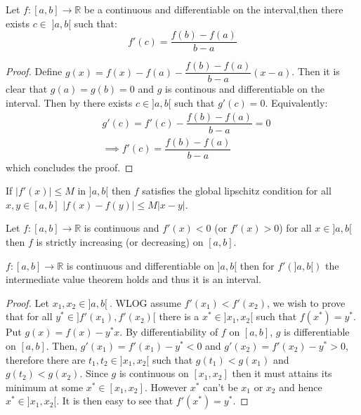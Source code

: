 \begin{theorem}\label{MVT}
    Let \(f: [a,b] \to \mathbb{R}\) be a continuous and differentiable on the interval,then there exists \(c \in \; ]a,b[\) such that:
    \[f'(c) = \dfrac{f(b) - f(a)}{b - a}\]
\end{theorem}
\begin{proof}
    Define \(g(x) = f(x)  - f(a) - \dfrac{f(b) - f(a)}{b-a}(x-a)\). Then it is clear that \(g(a) = g(b) = 0\) and \(g\) is continous and differentiable on the interval. Then by  there exists \(c \in ]a,b[\) such that \(g'(c) = 0\). Equivalently:
    \begin{align*}
         & g'(c) = f'(c) -  \dfrac{f(b) - f(a)}{b-a} = 0 \\
         & \implies f'(c) =  \dfrac{f(b) - f(a)}{b-a}
    \end{align*}
    which concludes the proof.
\end{proof}
\begin{corollary}
    If \(|f'(x)| \leq M \) in \(]a,b[\) then \(f\) satisfies the global lipschitz condition for all \(x,y \in [a,b]\) \(|f(x) - f(y) | \leq M |x-y|  \).
\end{corollary}
\begin{corollary}
    Let \(f: [a,b] \to \mathbb{R}\) is continuous and \(f'(x) < 0\) (or \(f'(x) > 0\)) for all \(x \in ]a,b[\) then \(f\) is strictly increasing (or decreasing) on \([a,b]\).
\end{corollary}
\begin{theorem}
    \(f: [a,b] \to \mathbb{R}\) is continuous and differentiable on \(]a,b[\) then for \(f'(]a,b[)\) the intermediate value theorem holds and thus it is an interval.
\end{theorem}
\begin{proof}
    Let \(x_1, x_2 \in ]a,b[\ \). WLOG assume \(f'(x_1) < f'(x_2)\), we wish to prove that for all \(y^* \in ]f'(x_1), f'(x_2)[\) there is a \(x^* \in ]x_1,x_2[ \) such that \(f(x^*) = y^*\). Put \(g(x) = f(x) - y^*x\). By differentiability of \(f\) on \([a,b]\), \(g\) is differentiable on \([a,b]\). Then, \(g'(x_1) = f'(x_1) - y^* < 0\) and \(g'(x_2) =  f'(x_2) - y^* > 0\), therefore there are \(t_1,t_2 \in ]x_1,x_2[\) such that \(g(t_1) < g(x_1)\) and \(g(t_2) < g(x_2)\). Since \(g\) is continuous on \([x_1,x_2]\) then it must attains its minimum at some \(x^* \in [x_1,x_2]\). However \(x^* \) can't be \(x_1\) or \(x_2\) and hence \(x^* \in ]x_1,x_2[\). It is then easy to see that \(f'(x^*) = y^*\).
\end{proof}
